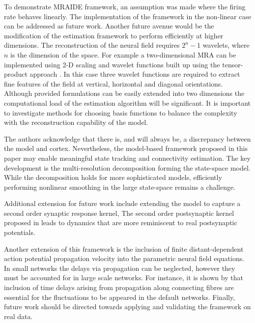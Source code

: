 \documentclass[review,authoryear,3p]{elsarticle}
\begin{document}

To demonstrate MRAIDE framework, an assumption was made where the firing rate behaves linearly. The implementation of the framework in the non-linear case can be addressed as future work. Another future avenue would be the modification of the estimation framework to perform efficiently at higher dimensions. The reconstruction of the neural field requires $2^n-1$ wavelets, where $n$ is the dimension of the space. For example a two-dimensional MRA can be implemented using 2-D scaling and wavelet functions built up using the tensor-product approach \citep{Meyer1992}. In this case three wavelet functions are required to  extract fine features of the field at vertical, horizontal and diagonal orientations. Although provided formulations can be easily extended into two dimensions the  computational load of the estimation algorithm will be significant. It is important to investigate methods for choosing basis functions to balance the complexity with the reconstruction capability of the model.
 
The authors acknowledge that there is, and will always be, a discrepancy between the model and cortex. Nevertheless, the model-based framework proposed in this paper may enable meaningful state tracking and connectivity estimation. The key development is the multi-resolution decomposition forming the state-space model. While the decomposition holds for more sophisticated models, efficiently performing nonlinear smoothing in the large state-space remains a challenge. 

Additional extension for future work include extending the model to capture a second order synaptic response kernel, The second order postsynaptic kernel proposed in \citet{VanRotterdam1982} leads to dynamics that are more reminiscent to real postsynaptic potentials. 

Another extension of this framework is the inclusion of finite distant-dependent action potential propagation velocity into the parametric neural field equations. In small networks the delays via propagation can be neglected, however they must be accounted for in large scale networks. For instance, it is shown by \citet{Ghosh2008} that inclusion of time delays arising from propagation along connecting fibres are essential for the fluctuations to be appeared in the default networks. Finally, future work should be directed towards applying and validating the framework on real data.
\end{document}
